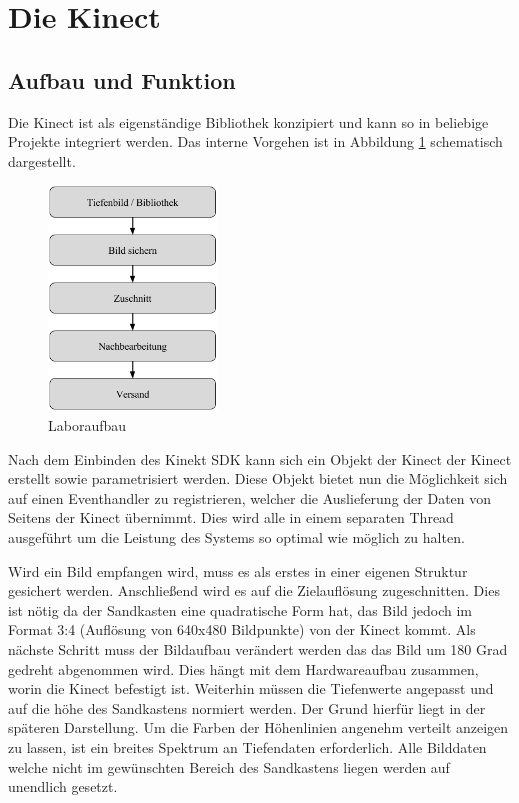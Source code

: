 \section{Die Kinect}
\begin{Spacing}{\mylinespace}

\subsection{Aufbau und Funktion}

Die Kinect ist als eigenständige Bibliothek konzipiert und kann so in beliebige Projekte integriert werden. Das interne Vorgehen ist in Abbildung \ref{fig:kinectdll} schematisch dargestellt. 

\begin{figure}[hbtp]
	\vspace{15px}
	\centering
	\includegraphics[width=0.4\textwidth]{graphics/block_dll.png}
	\caption{Laboraufbau}
	\label{fig:kinectdll}
\end{figure}

Nach dem Einbinden des Kinekt SDK kann sich ein Objekt der Kinect der Kinect erstellt sowie parametrisiert werden. Diese Objekt bietet nun die Möglichkeit sich auf einen Eventhandler zu registrieren, welcher die Auslieferung der Daten von Seitens der Kinect übernimmt. Dies wird alle in einem separaten Thread ausgeführt um die Leistung des Systems so optimal wie möglich zu halten.

Wird ein Bild empfangen wird, muss es als erstes in einer eigenen Struktur gesichert werden. Anschließend wird es auf die Zielauflösung zugeschnitten.
Dies ist nötig da der Sandkasten eine quadratische Form hat, das Bild jedoch im Format 3:4 (Auflösung von 640x480 Bildpunkte) von der Kinect kommt.
Als nächste Schritt muss der Bildaufbau verändert werden das das Bild um 180 Grad gedreht abgenommen wird. Dies hängt mit dem Hardwareaufbau zusammen, worin die Kinect befestigt ist. Weiterhin müssen die Tiefenwerte angepasst und auf die höhe des Sandkastens normiert werden. Der Grund hierfür liegt in der späteren Darstellung. Um die Farben der Höhenlinien angenehm verteilt anzeigen zu lassen, ist ein breites Spektrum an Tiefendaten erforderlich. Alle Bilddaten welche nicht im gewünschten Bereich des Sandkastens liegen werden auf unendlich gesetzt.


\end{Spacing}
